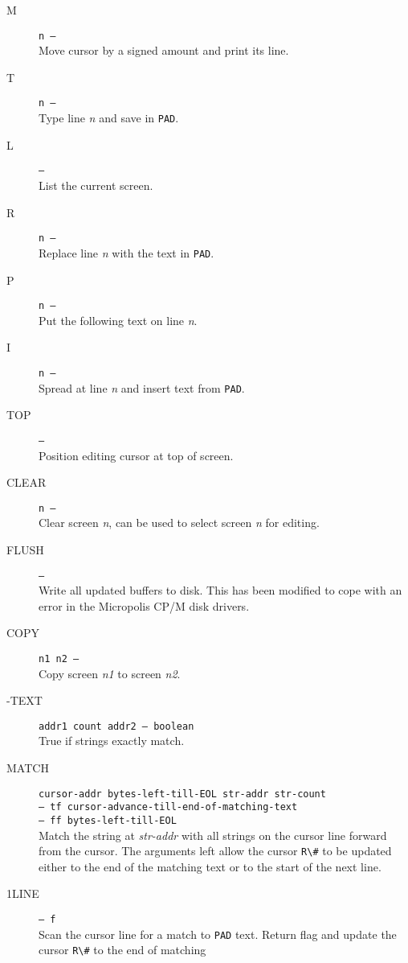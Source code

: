 \documentclass{article}
\newcommand{\n}{\textit{n}}
\begin{document}
\begin{multicols*}{2}[]
\begin{description}
		\item[M]\texttt{n ---}\\
			Move cursor by a signed amount and print its line.
		\item[T]\texttt{n ---}\\
			Type line \n{} and save in \verb|PAD|.
		\item[L]\texttt{---}\\
			List the current screen.
		\item[R]\texttt{n ---}\\
			Replace line \n{} with the text in \verb|PAD|.
		\item[P]\texttt{n ---}\\
			Put the following text on line \n{}.
		\item[I]\texttt{n ---}\\
			Spread at line \n{} and insert text from \verb|PAD|.
		\item[TOP]\texttt{---}\\
			Position editing cursor at top of screen.
		\item[CLEAR]\texttt{n ---}\\
			Clear screen \n{}, can be used to select screen \n{}
			for editing.
		\item[FLUSH]\texttt{---}\\
			Write all updated buffers to disk. This has been modified to
			cope with an error in the Micropolis CP/M disk drivers.
		\item[COPY]\texttt{n1 n2 ---}\\
			Copy screen \textit{n1} to screen \textit{n2}.
		\item[-TEXT]\texttt{addr1 count addr2 -- boolean}\\
			True if strings exactly match.
		\item[MATCH]\texttt{cursor-addr bytes-left-till-EOL str-addr str-count
			\\---    tf cursor-advance-till-end-of-matching-text
			\\---    ff bytes-left-till-EOL}\\
			Match the string at \textit{str-addr} with all strings on the
			cursor line forward from the cursor.  The arguments  left allow
			the cursor \verb|R\#| to be updated either to the end of the
			matching text or to the start of the next line.
		\item[1LINE]\texttt{--- f}\\
			Scan the cursor line for a match to \verb|PAD| text. Return
			flag and update the cursor \verb|R\#| to the end of matching

\end{description}
\end{multicols*}
\end{document}
